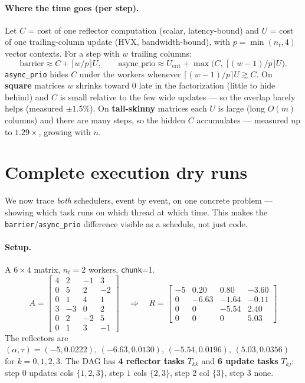 \documentclass[11pt]{article}
\newcommand{\code}[1]{\texttt{\small #1}}
\begin{document}
\paragraph{Where the time goes (per step).} Let $C$ = cost of one reflector
computation (scalar, latency-bound) and $U$ = cost of one trailing-column update
(HVX, bandwidth-bound), with $p=\min(n_t,4)$ vector contexts. For a step with $w$
trailing columns:
\[
\text{barrier} \approx C + \big\lceil w/p\big\rceil U,
\qquad
\text{async\_prio} \approx U_{\text{crit}} + \max\!\big(C,\ \big\lceil (w{-}1)/p\big\rceil U\big).
\]
\code{async\_prio} hides $C$ under the workers whenever
$\lceil (w{-}1)/p\rceil U \gtrsim C$. On \textbf{square} matrices $w$ shrinks toward $0$
late in the factorization (little to hide behind) and $C$ is small relative to the few
wide updates --- so the overlap barely helps (measured $\pm1.5\%$). On
\textbf{tall-skinny} matrices each $U$ is large (long $O(m)$ columns) and there are many
steps, so the hidden $C$ accumulates --- measured up to $1.29\times$, growing with $n$.

\section{Complete execution dry runs}
We now trace \emph{both} schedulers, event by event, on one concrete problem ---
showing which task runs on which thread at which time. This makes the
\code{barrier}/\code{async\_prio} difference visible as a schedule, not just code.

\paragraph{Setup.} A $6\times4$ matrix, $n_t{=}2$ workers, \code{chunk}=1.
\[
A=\begin{bmatrix}
4&2&-1&3\\ 0&5&2&-2\\ 0&1&4&1\\ 3&-3&0&2\\ 0&2&-2&5\\ 0&1&3&-1
\end{bmatrix}
\quad\Rightarrow\quad
R=\begin{bmatrix}
-5 & 0.20 & 0.80 & -3.60\\
 0 & -6.63& -1.64& -0.11\\
 0 & 0    & -5.54&  2.40\\
 0 & 0    & 0    &  5.03
\end{bmatrix}
\]
The reflectors are
$(\alpha,\tau)=(-5,0.0222),\,(-6.63,0.0130),\,(-5.54,0.0196),\,(5.03,0.0356)$ for
$k=0,1,2,3$. The DAG has \textbf{4 reflector tasks} $T_{kk}$ and \textbf{6 update tasks}
$T_{kj}$: step $0$ updates cols $\{1,2,3\}$, step $1$ cols $\{2,3\}$, step $2$ col
$\{3\}$, step $3$ none.
\end{document}
